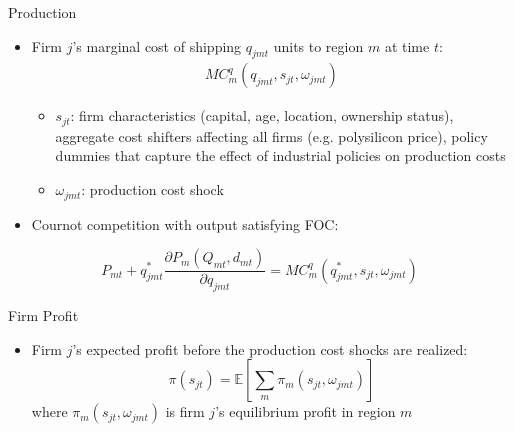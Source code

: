 \documentclass[xcolor=dvipsnames,envcountsect]{beamer}
\begin{document}
\begin{frame}{Production}
\begin{itemize}
    \item Firm $j$'s marginal cost of shipping $q_{jmt}$ units to region $m$ at time $t$:
    \begin{align}
         MC^q_m(q_{jmt},s_{jt},\omega_{jmt}) \nonumber
    \end{align}
       
    \begin{itemize}
        \item $s_{jt}$: firm characteristics (capital, age, location, ownership status), aggregate cost shifters affecting all firms (e.g. polysilicon price), policy dummies that capture the effect of industrial policies on production costs
        \item $\omega_{jmt}$: production cost shock
    \end{itemize}
\end{itemize}

\pause

\begin{itemize}
    \item Cournot competition with output satisfying FOC:
\end{itemize}
    \begin{equation}
    P_{mt}+q_{jmt}^*\frac{\partial P_{m}(Q_{mt},d_{mt})}{\partial q_{jmt}}=MC^q_m (q_{jmt}^*,s_{jt},\omega_{jmt}) \label{eq:foc_q}
    \end{equation}
\end{frame}

\begin{frame}{Firm Profit}
\begin{itemize}
\item Firm $j$'s expected profit before the production cost shocks are realized:
\[
\pi(s_{jt}) = \mathbb{E} [\sum_m \pi_m(s_{jt},\omega_{jmt})]
\]
where $\pi_m(s_{jt},\omega_{jmt})$ is firm $j$'s equilibrium profit in region $m$
\end{itemize}
\end{frame}
\end{document}
